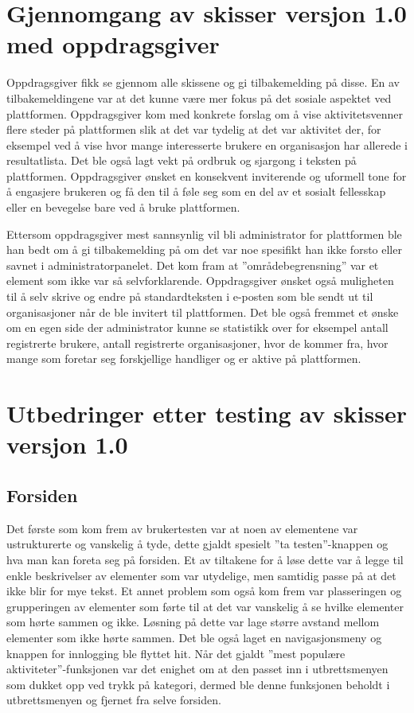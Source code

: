 \section{Gjennomgang av skisser versjon 1.0 med oppdragsgiver}
\label{section:skisser1.0-oppdragsgiver}

Oppdragsgiver fikk se gjennom alle skissene og gi tilbakemelding på disse. En av tilbakemeldingene var at det kunne være mer fokus på det sosiale aspektet ved plattformen. Oppdragsgiver kom med konkrete forslag om å vise aktivitetsvenner flere steder på plattformen slik at det var tydelig at det var aktivitet der, for eksempel ved å vise hvor mange interesserte brukere en organisasjon har allerede i resultatlista. Det ble også lagt vekt på ordbruk og sjargong i teksten på plattformen. Oppdragsgiver ønsket en konsekvent inviterende og uformell tone for å engasjere brukeren og få den til å føle seg som en del av et sosialt fellesskap eller en bevegelse bare ved å bruke plattformen.

Ettersom oppdragsgiver mest sannsynlig vil bli administrator for plattformen ble han bedt om å gi tilbakemelding på om det var noe spesifikt han ikke forsto eller savnet i administratorpanelet. Det kom fram at ''områdebegrensning'' var et element som ikke var så selvforklarende. Oppdragsgiver ønsket også muligheten til å selv skrive og endre på standardteksten i e-posten som ble sendt ut til organisasjoner når de ble invitert til plattformen. Det ble også fremmet et ønske om en egen side der administrator kunne se statistikk over for eksempel antall registrerte brukere, antall registrerte organisasjoner, hvor de kommer fra, hvor mange som foretar seg forskjellige handliger og er aktive på plattformen.


\section{Utbedringer etter testing av skisser versjon 1.0}
\label{section:utbedringer-skisser-1}
\subsection{Forsiden}

Det første som kom frem av brukertesten var at noen av elementene var ustrukturerte og vanskelig å tyde, dette gjaldt spesielt ''ta testen''-knappen og hva man kan foreta seg på forsiden. Et av tiltakene for å løse dette var å legge til enkle beskrivelser av elementer som var utydelige, men samtidig passe på at det ikke blir for mye tekst. Et annet problem som også kom frem var plasseringen og grupperingen av elementer som førte til at det var vanskelig å se hvilke elementer som hørte sammen og ikke. Løsning på dette var lage større avstand mellom elementer som ikke hørte sammen. Det ble også laget en navigasjonsmeny og knappen for innlogging ble flyttet hit. Når det gjaldt ''mest populære aktiviteter''-funksjonen var det enighet om at den passet inn i utbrettsmenyen som dukket opp ved trykk på kategori, dermed ble denne funksjonen beholdt i utbrettsmenyen og fjernet fra selve forsiden.

